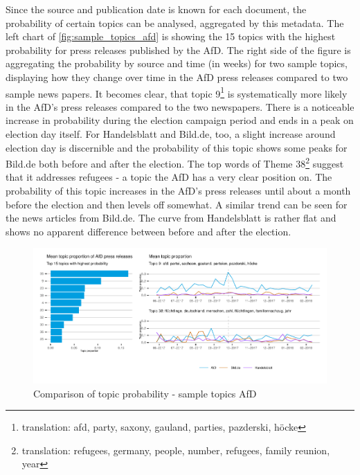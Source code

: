 \documentclass[
]{article}
\begin{document}
Since the source and publication date is known for each document, the
probability of certain topics can be analysed, aggregated by this
metadata. The left chart of \autoref{fig:sample_topics_afd} is showing
the 15 topics with the highest probability for press releases published
by the AfD. The right side of the figure is aggregating the probability
by source and time (in weeks) for two sample topics, displaying how they
change over time in the AfD press releases compared to two sample news
papers. It becomes clear, that topic 9\footnote{translation: afd, party,
  saxony, gauland, parties, pazderski, höcke} is systematically more
likely in the AfD's press releases compared to the two newspapers. There
is a noticeable increase in probability during the election campaign
period and ends in a peak on election day itself. For Handelsblatt and
Bild.de, too, a slight increase around election day is discernible and
the probability of this topic shows some peaks for Bild.de both before
and after the election. The top words of Theme 38\footnote{translation:
  refugees, germany, people, number, refugees, family reunion, year}
suggest that it addresses refugees - a topic the AfD has a very clear
position on. The probability of this topic increases in the AfD's press
releases until about a month before the election and then levels off
somewhat. A similar trend can be seen for the news articles from
Bild.de. The curve from Handelsblatt is rather flat and shows no
apparent difference between before and after the election.

\begin{figure}

{\centering \includegraphics[width=1\linewidth]{main_text_files/figure-latex/Top AfD topics-1} 

}

\caption{Comparison of topic probability - sample topics AfD \label{fig:sample_topics_afd}}\label{fig:Top AfD topics}
\end{figure}
\end{document}
